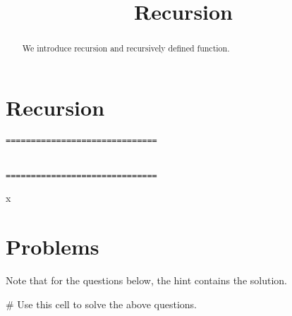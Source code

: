 \documentclass{ximera}
\title{Recursion}
\begin{document}
  
\begin{abstract}  
We introduce recursion and recursively defined function.
\end{abstract}  
\maketitle

\section{Recursion}



\begin{verbatim}
==============================


==============================
\end{verbatim}


\begin{sageCell}
x
\end{sageCell}

\section{Problems}

Note that for the questions below, the hint contains the solution.

\begin{sageCell}
# Use this cell to solve the above questions.
\end{sageCell}
\end{document}
